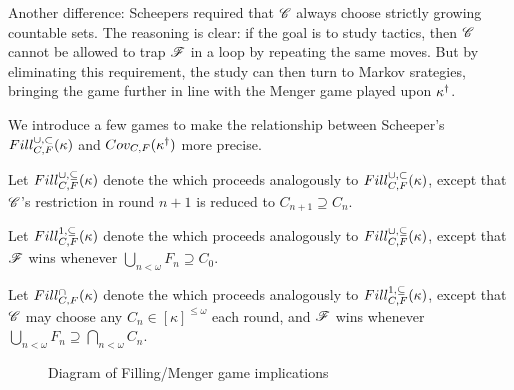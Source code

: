 Another difference: Scheepers required that $\mathscr{C}$ always choose strictly
growing countable sets. The reasoning is clear: if the goal is to study tactics,
then $\mathscr{C}$ cannot be allowed to trap $\mathscr{F}$ in a loop by repeating the same
moves. But by eliminating this requirement, the study can then turn to Markov
srategies, bringing the game further in line with the Menger game played upon
$\kappa^\dagger$.

We introduce a few games to make the relationship between Scheeper's
$Fill^{\cup,\subset}_{C,F}(\kappa)$ and $Cov_{C,F}(\kappa^\dagger)$ more precise.

\begin{game}
  Let $Fill^{\cup,\subseteq}_{C,F}(\kappa)$ denote the
   which proceeds analogously
  to $Fill^{\cup,\subset}_{C,F}(\kappa)$, except that $\mathscr{C}$'s restriction in round $n+1$
  is reduced to $C_{n+1}\supseteq C_n$.
\end{game}

\begin{game}
  Let $Fill^{1,\subseteq}_{C,F}(\kappa)$ denote the
   which proceeds analogously
  to $Fill^{\cup,\subseteq}_{C,F}(\kappa)$, except that $\mathscr{F}$ wins whenever
  $\bigcup_{n<\omega}F_n\supseteq C_0$.
\end{game}

\begin{game}
  Let $Fill^{\cap}_{C,F}(\kappa)$ denote the
   which proceeds analogously
  to $Fill^{1,\subseteq}_{C,F}(\kappa)$, except that $\mathscr{C}$ may choose any
  $C_n\in[\kappa]^{\leq\omega}$ each round, and $\mathscr{F}$ wins whenever
  $\bigcup_{n<\omega}F_n\supseteq\bigcap_{n<\omega}C_n$.
\end{game}

\begin{figure}[h]
\begin{center}
\end{center}
\caption{Diagram of Filling/Menger game implications}
\label{fillingGamesDiagram}
\end{figure}

